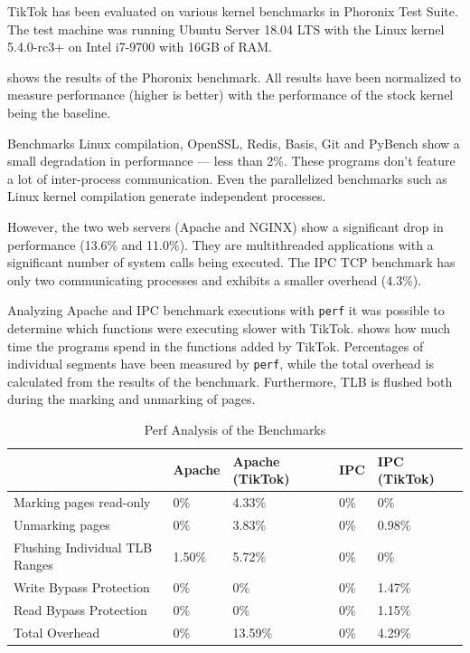 
TikTok has been evaluated on various kernel benchmarks in Phoronix
Test Suite\cite{phoronix}. The test machine was running Ubuntu Server 18.04 LTS
with the Linux kernel 5.4.0-rc3+ on Intel i7-9700 with 16GB of RAM.

 shows the results of the Phoronix benchmark. All
results have been normalized to measure performance (higher is better) with the
performance of the stock kernel being the baseline.

Benchmarks Linux compilation, OpenSSL, Redis, Basis, Git and PyBench show a
small degradation in performance --- less than 2\%. These programs don't feature
a lot of inter-process communication. Even the parallelized benchmarks such as
Linux kernel compilation generate independent processes.

However, the two web servers (Apache and NGINX) show a significant drop in
performance (13.6\% and 11.0\%). They are multithreaded applications with a
significant number of system calls being executed. The IPC TCP benchmark has
only two communicating processes and exhibits a smaller overhead (4.3\%).

Analyzing Apache and IPC benchmark executions with \texttt{perf} it was possible
to determine which functions were executing slower with TikTok.
 shows how much time the programs spend in the functions added
by TikTok. Percentages of individual segments have been measured by
\texttt{perf}, while the total overhead is calculated from the results of the
benchmark. Furthermore, TLB is flushed both during the marking and unmarking of
pages.

\begin{table}[]
  \label{table:perf}
  \centering
  \begin{tabular}{|l|l|l|l|l|}
  \hline
                                 & Apache & Apache (TikTok) & IPC & IPC (TikTok)\\ \hline
  Marking pages read-only        & 0\%    & 4.33\%          & 0\% & 0\%         \\ \hline
  Unmarking pages                & 0\%    & 3.83\%          & 0\% & 0.98\%      \\ \hline
  Flushing Individual TLB Ranges & 1.50\% & 5.72\%          & 0\% & 0\%         \\ \hline
  Write Bypass Protection        & 0\%    & 0\%             & 0\% & 1.47\%      \\ \hline
  Read Bypass Protection         & 0\%    & 0\%             & 0\% & 1.15\%      \\ \hline
  Total Overhead                 & 0\%    & 13.59\%         & 0\% & 4.29\%      \\ \hline
  \end{tabular}
  \caption{Perf Analysis of the Benchmarks}
\end{table}

